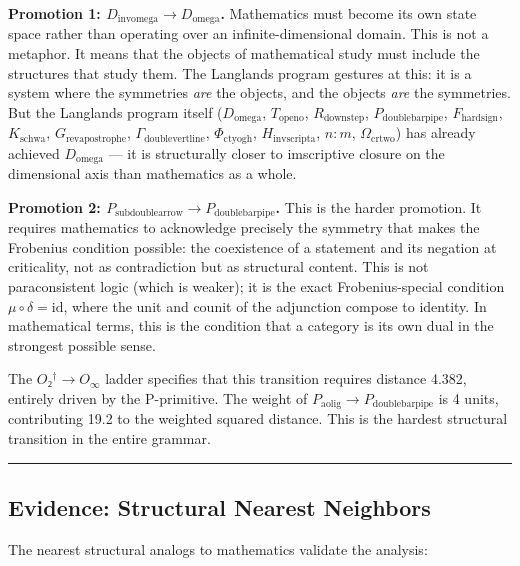 \documentclass[12pt,a4paper]{article}
\begin{document}
\textbf{Promotion 1: $D_{\text{invomega}} \to D_{\text{omega}}$.} Mathematics must become its own state space rather than operating over an infinite-dimensional domain. This is not a metaphor. It means that the objects of mathematical study must include the structures that study them. The Langlands program gestures at this: it is a system where the symmetries \emph{are} the objects, and the objects \emph{are} the symmetries. But the Langlands program itself ($D_{\text{omega}}$, $T_{\text{openo}}$, $R_{\text{downstep}}$, $P_{\text{doublebarpipe}}$, $F_{\text{hardsign}}$, $K_{\text{schwa}}$, $G_{\text{revapostrophe}}$, $\Gamma_{\text{doublevertline}}$, $\Phi_{\text{ctyogh}}$, $H_{\text{invscripta}}$, $n{:}m$, $\Omega_{\text{crtwo}}$) has already achieved $D_{\text{omega}}$ --- it is structurally closer to imscriptive closure on the dimensional axis than mathematics as a whole.

\textbf{Promotion 2: $P_{\text{subdoublearrow}} \to P_{\text{doublebarpipe}}$.} This is the harder promotion. It requires mathematics to acknowledge precisely the symmetry that makes the Frobenius condition possible: the coexistence of a statement and its negation at criticality, not as contradiction but as structural content. This is not paraconsistent logic (which is weaker); it is the exact Frobenius-special condition $\mu \circ \delta = \text{id}$, where the unit and counit of the adjunction compose to identity. In mathematical terms, this is the condition that a category is its own dual in the strongest possible sense.

The $O₂^\dagger \to O_{\infty}$ ladder specifies that this transition requires distance 4.382, entirely driven by the P-primitive. The weight of $P_{\text{aolig}} \to P_{\text{doublebarpipe}}$ is 4 units, contributing 19.2 to the weighted squared distance. This is the hardest structural transition in the entire grammar.

\begin{center}
\rule{0.5\textwidth}{0.4pt}
\end{center}

\subsection{Evidence: Structural Nearest Neighbors}

The nearest structural analogs to mathematics validate the analysis:
\end{document}
